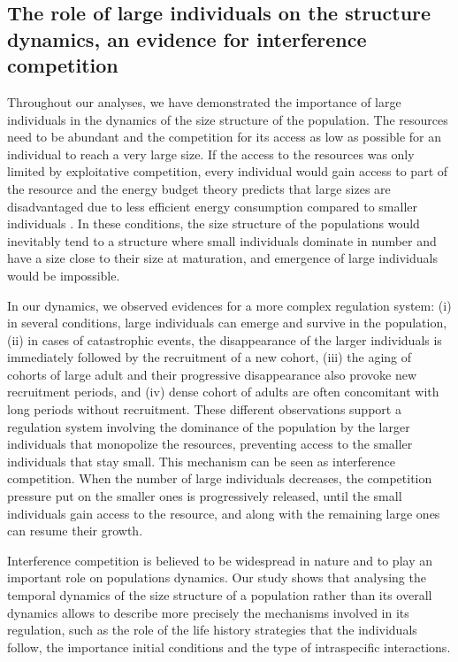 \subsection{The role of large individuals on the structure dynamics, an evidence
for interference competition}

Throughout our analyses, we have demonstrated the importance of large
individuals in the dynamics of the size structure of the population. The
resources need to be abundant and the competition for its access as low as
possible for an individual to reach a very large size. If the access to the
resources was only limited by exploitative competition, every individual would
gain access to part of the resource and the energy budget theory predicts that
large sizes are disadvantaged due to less efficient energy consumption compared
to smaller individuals \autocites{de-roos2003b}. In these conditions, the
size structure of the populations would inevitably tend to a structure where small individuals
dominate in number and have a size close to their size at maturation, and
emergence of large individuals would be impossible.

In our dynamics, we observed evidences for a more complex regulation system: (i)
in several conditions, large individuals can emerge and survive in the
population, (ii) in cases of catastrophic events, the disappearance of the
larger individuals is immediately followed by the recruitment of a new cohort,
(iii) the aging of cohorts of large adult and their progressive disappearance
also provoke new recruitment periods, and (iv) dense cohort of adults are often
concomitant with long periods without recruitment. These different observations
support a regulation system involving the dominance of the population by the
larger individuals that monopolize the resources, preventing access to the
smaller individuals that stay small. This mechanism can be seen as interference
competition. When the number of large individuals decreases, the competition
pressure put on the smaller ones is progressively released, until the small
individuals gain access to the resource, and along with the remaining large ones
can resume their growth.

Interference competition is believed to be widespread in nature and to play an
important role on populations dynamics. Our study shows that analysing the
temporal dynamics of the size structure of a population rather than its overall
dynamics allows to describe more precisely the mechanisms involved in its
regulation, such as the role of the life history strategies that the individuals
follow, the importance initial conditions and the type of intraspecific
interactions.

